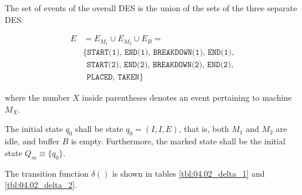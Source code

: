 The set of events of the overall DES is the union of the sets of the three
separate DES:

\begin{align*}
  E &= E_{M_1} \cup E_{M_2} \cup E_{B} = \\
    & \{\texttt{START(1), END(1), BREAKDOWN(1), END(1)}, \\
    &\ \ \texttt{START(2), END(2), BREAKDOWN(2), END(2)}, \\
    &\ \ \texttt{PLACED, TAKEN}\}
\end{align*}

where the number $X$ inside parentheses denotes an event pertaining to machine
$M_X$.

The initial state $q_0$ shall be state $q_0 = (I,I,E)$, that is, both $M_1$ and
$M_2$ are idle, and buffer $B$ is empty. Furthermore, the marked state shall be
the initial state $Q_m \equiv \{q_0\}$.

The transition function $\delta()$ is shown in tables \ref{tbl:04.02_delta_1}
and \ref{tbl:04.02_delta_2}.


